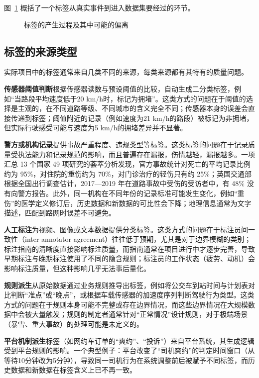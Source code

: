 图~\ref{fig:ch04_label} 概括了一个标签从真实事件到进入数据集要经过的环节。

\begin{figure}[H]
  \centering
  \caption{标签的产生过程及其中可能的偏离}
  \label{fig:ch04_label}
\end{figure}

\subsection{标签的来源类型}

实际项目中的标签通常来自几类不同的来源，每类来源都有其特有的质量问题。

\textbf{传感器阈值判断}根据传感器读数与预设阈值的比较，自动生成二分类标签，例如“当路段平均速度低于20 km/h时，标记为拥堵”。这类方式的问题在于阈值的选择是主观的，在不同道路等级、不同城市的含义完全不同；传感器本身的误差会直接传递到标签；阈值附近的记录（例如速度为21 km/h的路段）被标记为非拥堵，但实际行驶感受可能与速度为5 km/h的拥堵差异并不显著。

\textbf{警方或机构记录}提供事故严重程度、违规类型等标签。这类标签的问题在于记录质量受执法能力和记录规范的影响，而且普遍存在漏报，伤情越轻，漏报越多。一项汇总 13 个国家 49 项研究的荟萃分析发现，官方事故统计对死亡的平均记录比例约为 95\%，对住院的重伤约为 70\%，对门诊治疗的轻伤只有约 25\%\cite{elvik1999incomplete}；英国交通部根据全国出行调查估计，2017—2019 年在道路事故中受伤的受访者中，有 48\% 没有向警方报告\cite{dft2021othersources}。此外，同一机构在不同年份的记录标准可能发生变化，例如“重伤”的医学定义修订后，历史数据和新数据的可比性会下降；地理信息通常为文字描述，匹配到路网时误差不可避免。

\textbf{人工标注}为视频、图像或文本数据提供分类标签。这类方式的问题在于标注员间一致性（inter-annotator agreement）往往低于预期，尤其是对于边界模糊的类别；标注指南的清晰度直接影响标注质量，而指南通常在项目进行中才逐步完善，导致早期标注与晚期标注使用了不同的隐含规则；标注员的工作状态（疲劳、动机）会影响标注质量，但这种影响几乎无法事后量化。

\textbf{规则派生}从原始数据通过业务规则推导出标签，例如将公交车到站时间与计划表对比判断“准点”或“晚点”，或根据车载传感器的加速度序列判断驾驶行为类型。这类方式的问题在于规则本身可能不完整或存在边界情况，而这些边界情况在大规模数据中会被大量触发；规则的制定者通常针对“正常情况”设计规则，对于极端场景（暴雪、重大事故）的处理可能是未定义的。

\textbf{平台机制派生}标签（如网约车订单的“爽约”、“投诉”）来自平台系统，其生成逻辑受到平台规则的影响。一个典型例子：平台改变了“司机爽约”的判定时间窗口（从等待10分钟改为5分钟），导致同一司机行为在系统调整前后被赋予不同标签，而历史数据和新数据在标签含义上已不再一致。

